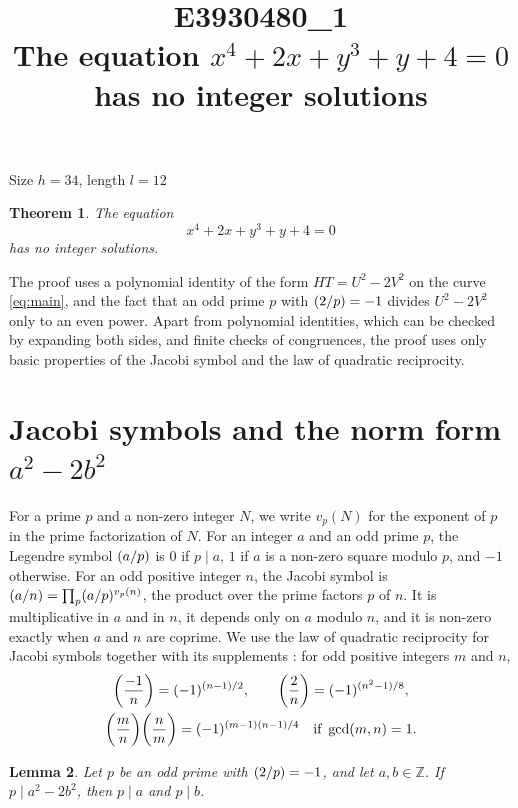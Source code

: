 \documentclass[11pt]{article}
\title{\textbf{E3930480\_1}\\[4pt] {\Large The equation $x^{4}+2x+y^{3}+y+4=0$ has no integer solutions}}
\author{}
\date{}
\newtheorem{theorem}{Theorem}
\newtheorem{lemma}[theorem]{Lemma}
\newcommand{\Z}{\mathbb{Z}}
\newcommand{\leg}[2]{\mathchoice{\biggl(\dfrac{#1}{#2}\biggr)}{(#1/#2)}{(#1/#2)}{(#1/#2)}}
\begin{document}
\maketitle
\vspace{-8ex}
\begin{center}
Size $h=34$, length $l=12$
\end{center}

\begin{theorem}\label{thm:main}
The equation
\begin{equation}\label{eq:main}
x^{4}+2x+y^{3}+y+4=0
\end{equation}
has no integer solutions.
\end{theorem}

The proof uses a polynomial identity of the form $HT=U^2-2V^2$ on the curve \eqref{eq:main}, and the fact that an odd prime $p$ with $\leg{2}{p}=-1$ divides $U^2-2V^2$ only to an even power. Apart from polynomial identities, which can be checked by expanding both sides, and finite checks of congruences, the proof uses only basic properties of the Jacobi symbol and the law of quadratic reciprocity.

\section{\texorpdfstring{Jacobi symbols and the norm form $a^2-2b^2$}{Jacobi symbols and the norm form}}

For a prime $p$ and a non-zero integer $N$, we write $v_p(N)$ for the exponent of $p$ in the prime factorization of $N$. For an integer $a$ and an odd prime $p$, the Legendre symbol $\leg{a}{p}$ is $0$ if $p\mid a$, $1$ if $a$ is a non-zero square modulo $p$, and $-1$ otherwise. For an odd positive integer $n$, the Jacobi symbol is $\leg{a}{n}=\prod_p\leg{a}{p}^{v_p(n)}$, the product over the prime factors $p$ of $n$. It is multiplicative in $a$ and in $n$, it depends only on $a$ modulo $n$, and it is non-zero exactly when $a$ and $n$ are coprime. We use the law of quadratic reciprocity for Jacobi symbols together with its supplements \cite[Chapter~5, \S2]{IR}: for odd positive integers $m$ and $n$,
\begin{gather*}
\leg{-1}{n}=(-1)^{(n-1)/2},\qquad\leg{2}{n}=(-1)^{(n^2-1)/8},\\
\leg{m}{n}\leg{n}{m}=(-1)^{(m-1)(n-1)/4}\quad\text{if }\gcd(m,n)=1.
\end{gather*}

\begin{lemma}\label{lem:divides}
Let $p$ be an odd prime with $\leg{2}{p}=-1$, and let $a,b\in\Z$. If $p\mid a^2-2b^2$, then $p\mid a$ and $p\mid b$.
\end{lemma}
\end{document}
